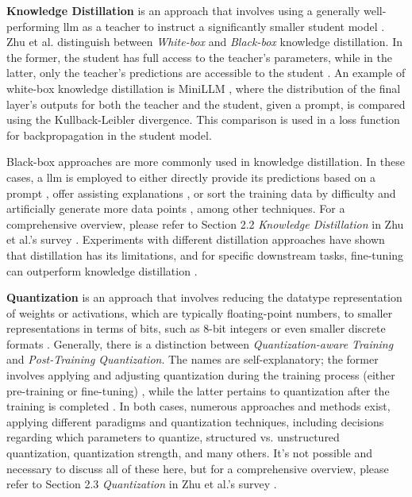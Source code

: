 \textbf{Knowledge Distillation} is an approach that involves using a generally well-performing \gls{llm} as a teacher to instruct a significantly smaller student model \cite{hinton_distilling_2015}. Zhu et al. distinguish between \textit{White-box} and \textit{Black-box} knowledge distillation. In the former, the student has full access to the teacher's parameters, while in the latter, only the teacher's predictions are accessible to the student \cite{zhu_survey_2023}. An example of white-box knowledge distillation is MiniLLM \cite{gu_knowledge_2023}, where the distribution of the final layer's outputs for both the teacher and the student, given a prompt, is compared using the Kullback-Leibler divergence. This comparison is used in a loss function for backpropagation in the student model.

Black-box approaches are more commonly used in knowledge distillation. In these cases, a \gls{llm} is employed to either directly provide its predictions based on a prompt \cite{huang_-context_2022}, offer assisting explanations \cite{li_explanations_2022}, or sort the training data by difficulty and artificially generate more data points \cite{jiang_lion_2023}, among other techniques. For a comprehensive overview, please refer to Section 2.2 \textit{Knowledge Distillation} in Zhu et al.'s survey \cite{zhu_survey_2023}. Experiments with different distillation approaches have shown that distillation has its limitations, and for specific downstream tasks, fine-tuning can outperform knowledge distillation \cite{zhu_teach_nodate}.

\textbf{Quantization} is an approach that involves reducing the datatype representation of weights or activations, which are typically floating-point numbers, to smaller representations in terms of bits, such as 8-bit integers or even smaller discrete formats \cite{gholami_survey_2021}. Generally, there is a distinction between \textit{Quantization-aware Training} and \textit{Post-Training Quantization}. The names are self-explanatory; the former involves applying and adjusting quantization during the training process (either pre-training or fine-tuning) \cite{liu_llm-qat_2023}, while the latter pertains to quantization after the training is completed \cite{frantar_gptq_2023}. In both cases, numerous approaches and methods exist, applying different paradigms and quantization techniques, including decisions regarding which parameters to quantize, structured vs. unstructured quantization, quantization strength, and many others. It's not possible and necessary to discuss all of these here, but for a comprehensive overview, please refer to Section 2.3 \textit{Quantization} in Zhu et al.'s survey \cite{zhu_survey_2023}.

